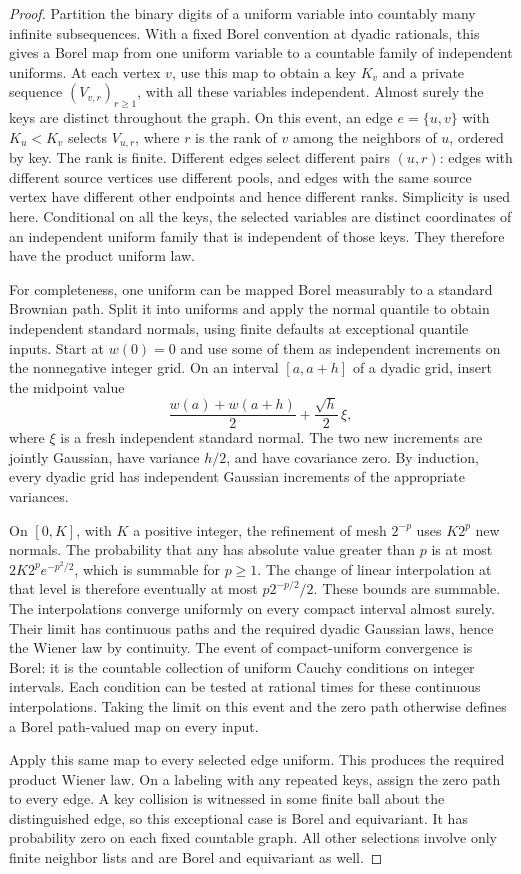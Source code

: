 \begin{proof}
Partition the binary digits of a uniform variable into countably many
infinite subsequences. With a fixed Borel convention at dyadic rationals,
this gives a Borel map from one uniform variable to a countable family of
independent uniforms. At each vertex $v$, use this map to obtain a key $K_v$
and a private sequence $(V_{v,r})_{r\ge1}$, with all these variables independent.
Almost surely the keys are distinct throughout the graph. On this event,
an edge $e=\{u,v\}$ with $K_u<K_v$ selects $V_{u,r}$, where $r$ is the rank
of $v$ among the neighbors of $u$, ordered by key. The rank is finite.
Different edges select different pairs $(u,r)$: edges with different source
vertices use different pools, and edges with the same source vertex have
different other endpoints and hence different ranks. Simplicity is used here.
Conditional on all the keys, the selected variables are distinct coordinates
of an independent uniform family that is independent of those keys. They
therefore have the product uniform law.

For completeness, one uniform can be mapped Borel measurably to a standard
Brownian path. Split it into uniforms and apply the normal quantile to
obtain independent standard normals, using finite defaults at exceptional
quantile inputs. Start at $w(0)=0$ and use some of them as independent increments on the
nonnegative integer grid. On an interval $[a,a+h]$ of a dyadic grid, insert
the midpoint value
\[
 \frac{w(a)+w(a+h)}2+\frac{\sqrt h}{2}\,\xi,
\]
where $\xi$ is a fresh independent standard normal. The two new increments
are jointly Gaussian, have variance $h/2$, and have covariance zero. By
induction, every dyadic grid has independent Gaussian increments of the
appropriate variances.

On $[0,K]$, with $K$ a positive integer, the refinement of mesh $2^{-p}$
uses $K2^p$ new normals. The probability that any has absolute value greater
than $p$ is at most $2K2^p e^{-p^2/2}$, which is summable for $p\ge1$.
The change of linear interpolation at that level is therefore eventually
at most $p2^{-p/2}/2$. These bounds are summable. The interpolations converge
uniformly on every compact interval almost surely. Their limit has continuous
paths and the required dyadic Gaussian laws, hence the Wiener law by
continuity. The event of compact-uniform convergence is Borel: it is the
countable collection of uniform Cauchy conditions on integer intervals.
Each condition can be tested at rational times for these continuous
interpolations. Taking the limit on this event and the zero path otherwise
defines a Borel path-valued map on every input.

Apply this same map to every selected edge uniform. This produces the
required product Wiener law. On a labeling with any repeated keys, assign
the zero path to every edge. A key collision is witnessed in some finite
ball about the distinguished edge, so this exceptional case is Borel and
equivariant. It has probability zero on each fixed countable graph. All
other selections involve only finite neighbor lists and are Borel and
equivariant as well.
\end{proof}

